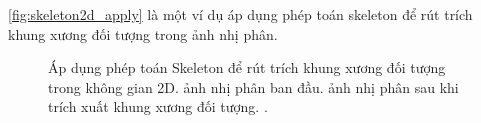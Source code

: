 	\autoref{fig:skeleton2d_apply} là một ví dụ áp dụng phép toán skeleton để rút trích khung xương đối tượng trong ảnh nhị phân.
	\begin{figure}[h!]
		\hfill
		\begin{subfigure}[b]{0.475\textwidth}
			\centering
			
			\caption{}
			\label{fig:skeleton2d_apply_before}
		\end{subfigure}
		\begin{subfigure}[b]{0.475\textwidth}
			\centering
			
			\caption{}
			\label{fig:skeleton2d_apply_after}
		\end{subfigure}
		\hfill\null
		\caption[Áp dụng phép toán Skeleton để rút trích khung xương đối tượng trong không gian 2D.]{Áp dụng phép toán Skeleton để rút trích khung xương đối tượng trong không gian 2D.  ảnh nhị phân ban đầu.  ảnh nhị phân sau khi trích xuất khung xương đối tượng. .}
		\label{fig:skeleton2d_apply}
	\end{figure}
	

